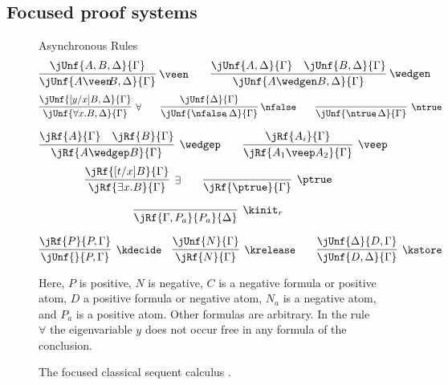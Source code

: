 \documentclass{llncs}
\begin{document}
\subsection{Focused proof systems}
\label{sec:focused ps}


\begin{figure}
	{\sc Asynchronous Rules}
\[
  \infer[\kern-2pt\veen]{\jUnf{A \veen\kern-3pt B, \Delta}{\Gamma}}
                 {\jUnf{A,B, \Delta}{\Gamma}}   
  \qquad 
  \infer[\kern-2pt\wedgen]{\jUnf{A \wedgen B, \Delta}{\Gamma}}
                   {\jUnf{A, \Delta}{\Gamma}
                    & 
                    \jUnf{B, \Delta}{\Gamma}}
\]
\[
 \infer[\forall]{\jUnf{\forall x.B, \Delta}{\Gamma}}
                   {\jUnf{[y/x]B, \Delta}{\Gamma}}	
\qquad
 \infer[\kern-2pt\nfalse]{\jUnf{\nfalse\kern-2pt,\Delta}{\Gamma}}
                           {\jUnf{\Delta}{\Gamma}}
\qquad
\infer[\ntrue]{\jUnf{\ntrue\kern-3pt,\Delta}{\Gamma}}{}
\]
	

\[
  \infer[\wedgep]{\jRf{A \wedgep B}{\Gamma}}
                   {\jRf{A}{\Gamma}
                    & 
                    \jRf{B}{\Gamma}}
  \qquad
  \infer[\veep]{\jRf{A_1 \veep A_2}{\Gamma}}
                 {\jRf{A_i}{\Gamma}}
\]
\[
  \infer[\exists]{\jRf{\exists x.B}{\Gamma}}
                   {\jRf{[t/x]B}{\Gamma}}
  \qquad
  \infer[\ptrue]{\jRf{\ptrue}{\Gamma}}{}
  \]

	
\[
  \infer[\kinit_r]{\jRf{\Gamma,P_a}{P_a}{\Delta}}{}
\]
	
	
\[
  \infer[\kdecide]{\jUnf{}{P, \Gamma}}
                    {\jRf{P}{P, \Gamma}}
  \quad
  \infer[\krelease]{\jRf{N}{\Gamma}}
                     {\jUnf{N}{\Gamma}}
  \qquad
  \infer[\kstore]{\jUnf{D, \Delta}{\Gamma}}
                   {\jUnf{\Delta}{D, \Gamma}}
\]
	
Here, $P$ is positive, $N$ is negative, $C$ is a negative formula or
positive atom, $D$ a positive formula or negative atom, $N_a$ is
a negative atom, and $P_a$ is a positive atom.  Other formulas
are arbitrary. In the rule $\forall$  the
eigenvariable $y$ does not occur free in any formula of the
conclusion.
\caption{The focused classical sequent calculus \LKF.}
\label{fig:lkf}
\end{figure}	
\end{document}
